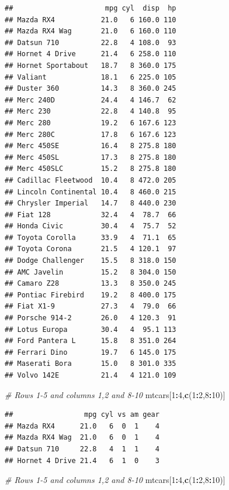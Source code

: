 \documentclass[]{book}
\newenvironment{Shaded}{\begin{snugshade}}{\end{snugshade}}
\newcommand{\KeywordTok}[1]{\textcolor[rgb]{0.13,0.29,0.53}{\textbf{#1}}}
\newcommand{\DecValTok}[1]{\textcolor[rgb]{0.00,0.00,0.81}{#1}}
\newcommand{\CommentTok}[1]{\textcolor[rgb]{0.56,0.35,0.01}{\textit{#1}}}
\newcommand{\OperatorTok}[1]{\textcolor[rgb]{0.81,0.36,0.00}{\textbf{#1}}}
\newcommand{\NormalTok}[1]{#1}
\begin{document}
\begin{verbatim}
##                      mpg cyl  disp  hp
## Mazda RX4           21.0   6 160.0 110
## Mazda RX4 Wag       21.0   6 160.0 110
## Datsun 710          22.8   4 108.0  93
## Hornet 4 Drive      21.4   6 258.0 110
## Hornet Sportabout   18.7   8 360.0 175
## Valiant             18.1   6 225.0 105
## Duster 360          14.3   8 360.0 245
## Merc 240D           24.4   4 146.7  62
## Merc 230            22.8   4 140.8  95
## Merc 280            19.2   6 167.6 123
## Merc 280C           17.8   6 167.6 123
## Merc 450SE          16.4   8 275.8 180
## Merc 450SL          17.3   8 275.8 180
## Merc 450SLC         15.2   8 275.8 180
## Cadillac Fleetwood  10.4   8 472.0 205
## Lincoln Continental 10.4   8 460.0 215
## Chrysler Imperial   14.7   8 440.0 230
## Fiat 128            32.4   4  78.7  66
## Honda Civic         30.4   4  75.7  52
## Toyota Corolla      33.9   4  71.1  65
## Toyota Corona       21.5   4 120.1  97
## Dodge Challenger    15.5   8 318.0 150
## AMC Javelin         15.2   8 304.0 150
## Camaro Z28          13.3   8 350.0 245
## Pontiac Firebird    19.2   8 400.0 175
## Fiat X1-9           27.3   4  79.0  66
## Porsche 914-2       26.0   4 120.3  91
## Lotus Europa        30.4   4  95.1 113
## Ford Pantera L      15.8   8 351.0 264
## Ferrari Dino        19.7   6 145.0 175
## Maserati Bora       15.0   8 301.0 335
## Volvo 142E          21.4   4 121.0 109
\end{verbatim}

\begin{Shaded}
\begin{Highlighting}[]
\CommentTok{# Rows 1-5 and columns 1,2 and 8-10}
\NormalTok{mtcars[}\DecValTok{1}\OperatorTok{:}\DecValTok{4}\NormalTok{,}\KeywordTok{c}\NormalTok{(}\DecValTok{1}\OperatorTok{:}\DecValTok{2}\NormalTok{,}\DecValTok{8}\OperatorTok{:}\DecValTok{10}\NormalTok{)]}
\end{Highlighting}
\end{Shaded}

\begin{verbatim}
##                 mpg cyl vs am gear
## Mazda RX4      21.0   6  0  1    4
## Mazda RX4 Wag  21.0   6  0  1    4
## Datsun 710     22.8   4  1  1    4
## Hornet 4 Drive 21.4   6  1  0    3
\end{verbatim}

\begin{Shaded}
\begin{Highlighting}[]
\CommentTok{# Rows 1-5 and columns 1,2 and 8-10}
\NormalTok{mtcars[}\DecValTok{1}\OperatorTok{:}\DecValTok{4}\NormalTok{,}\KeywordTok{c}\NormalTok{(}\DecValTok{1}\OperatorTok{:}\DecValTok{2}\NormalTok{,}\DecValTok{8}\OperatorTok{:}\DecValTok{10}\NormalTok{)]}
\end{Highlighting}
\end{Shaded}
\end{document}
